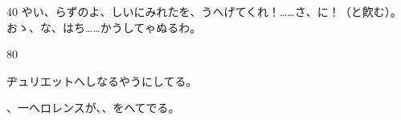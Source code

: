 \documentclass[tate,paper=b6j,jafontsize=9pt]{jlreq}
\begin{document}
\begin{azconvIndented}{4\zw}{0\zw}
やい、らずのよ、しいにみれたを、うへげてくれ！……さ、に！（と飮む）。おゝ、な、はち……かうしてゃぬるわ。

\end{azconvIndented}
\begin{azconvIndented}{8\zw}{0\zw}

ヂュリエットへしなるやうにしてる。

、一へロレンスが、、をへてでる。

\end{azconvIndented}
\end{document}
